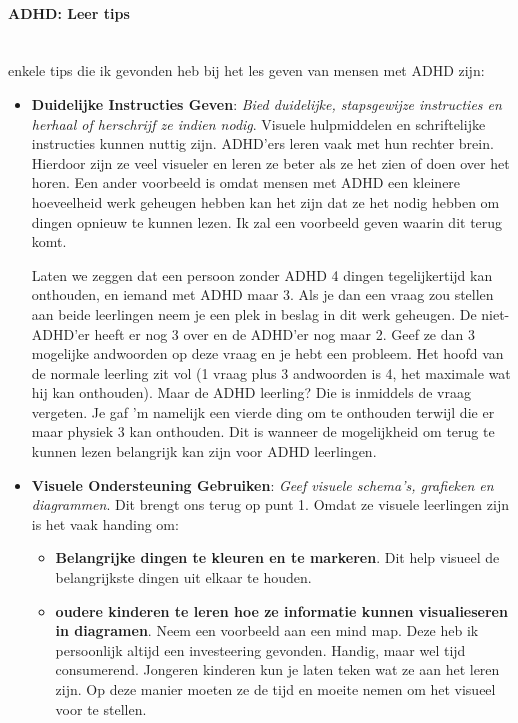                 \bigskip
                \noindent\paragraph{ADHD: Leer tips}\\
                enkele tips die ik gevonden heb bij het les geven van mensen met ADHD zijn:
                \begin{itemize}
                
                    \item \textbf{Duidelijke Instructies Geven}: 
                        \textit{Bied duidelijke, stapsgewijze instructies en herhaal of herschrijf ze indien nodig}. Visuele hulpmiddelen en schriftelijke instructies kunnen nuttig zijn\cite{ADHD-visual}. ADHD'ers leren vaak met hun rechter brein. Hierdoor zijn ze veel visueler en leren ze beter als ze het zien of doen over het horen. Een ander voorbeeld is omdat mensen met ADHD een kleinere hoeveelheid werk geheugen hebben kan het zijn dat ze het nodig hebben om dingen opnieuw te kunnen lezen. Ik zal een voorbeeld geven waarin dit terug komt. 

                        \smallskip
                    
                        Laten we zeggen dat een persoon zonder ADHD 4 dingen tegelijkertijd kan onthouden, en iemand met ADHD maar 3. Als je dan een vraag zou stellen aan beide leerlingen neem je een plek in beslag in dit werk geheugen. De niet-ADHD'er heeft er nog 3 over en de ADHD'er nog maar 2. Geef ze dan 3 mogelijke andwoorden op deze vraag en je hebt een probleem. Het hoofd van de normale leerling zit vol (1 vraag plus 3 andwoorden is 4, het maximale wat hij kan onthouden). Maar de ADHD leerling? Die is inmiddels de vraag vergeten. Je gaf 'm namelijk een vierde ding om te onthouden terwijl die er maar physiek 3 kan onthouden. Dit is wanneer de mogelijkheid om terug te kunnen lezen belangrijk kan zijn voor ADHD leerlingen.\cite{ADHD-video-working-memory}

                    \item \textbf{Visuele Ondersteuning Gebruiken}: 
                        \textit{Geef visuele schema's, grafieken en diagrammen}. Dit brengt ons terug op punt 1. Omdat ze visuele leerlingen zijn is het vaak handing om: 
                        \begin{itemize}
                            \item \textbf{Belangrijke dingen te kleuren en te markeren}. 
                                Dit help visueel de belangrijkste dingen uit elkaar te houden.
                            \item \textbf{oudere kinderen te leren hoe ze informatie kunnen visualieseren in diagramen}. 
                                Neem een voorbeeld aan een mind map. Deze heb ik persoonlijk altijd een investeering gevonden. Handig, maar wel tijd consumerend. Jongeren kinderen kun je laten teken wat ze aan het leren zijn. Op deze manier moeten ze de tijd en moeite nemen om het visueel voor te stellen. 
                        \end{itemize}
                        

\end{itemize}
